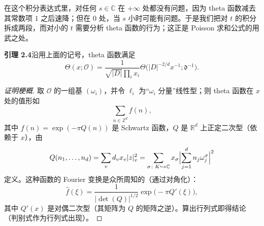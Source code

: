 在这个积分表达式里，对任何 $s\in\mathbb{C}$ 在 $+\infty$ 处都没有问题，因为 theta 函数减去其常数项 $1$ 之后速降；但在 $0$ 处，当 $s$ 小时可能有问题。于是我们把对 $t$ 的积分拆成两段，而对小的 $t$ 需要分析 theta 函数的行为；这正是 Poisson 求和公式的用武之处。

\par\medskip\noindent\textbf{引理 2.4}\quad 沿用上面的记号，theta 函数满足
\begin{equation}\tag{2.5}\label{c2:eq:2.5}
\Theta(x;\mathcal{O})=\frac{1}{\sqrt{|D|}\prod_i x_i}\Theta\bigl(|D|^{-2/d}x^{-1};\mathfrak{d}^{-1}\bigr).
\end{equation}

\begin{proof}[证明梗概]
取 $\mathcal{O}$ 的一组基 $(\omega_i)$，并令 $\ell_i$ 为“$\omega_i$ 分量”线性型；则 theta 函数在 $x$ 处的值形如
\[
\sum_{n\in\mathbb{Z}^d}f(n),
\]
其中 $f(n)=\exp(-\pi Q(n))$ 是 Schwartz 函数，$Q$ 是 $\mathbb{R}^d$ 上正定二次型（依赖于 $x$），由
\[
Q(n_1,\dots,n_d)=\sum_v d_vx_v|z|_v^2=\sum_{\sigma\colon K\hookrightarrow\mathbb{C}}x_\sigma\Bigl|\sum_{j=1}^d n_j\omega_j^\sigma\Bigr|^2
\]
定义。这种函数的 Fourier 变换是众所周知的（通过对角化）：
\[
\hat f(\xi)=\frac{1}{|\det(Q)|^{1/2}}\exp\bigl(-\pi Q'(\xi)\bigr),
\]
其中 $Q'(x)$ 是对偶二次型（其矩阵为 $Q$ 的矩阵之逆）。算出行列式即得结论（判别式作为行列式出现）。
\end{proof}

